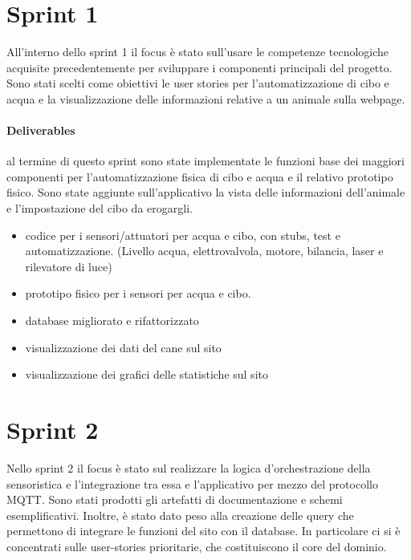 \section{Sprint 1}
All'interno dello sprint 1 il focus è stato sull'usare le competenze tecnologiche acquisite precedentemente per sviluppare i componenti principali del progetto. Sono stati scelti come obiettivi le user stories per l'automatizzazione di cibo e acqua e la visualizzazione delle informazioni relative a un animale sulla webpage.
\paragraph{Deliverables}
al termine di questo sprint sono state implementate le funzioni base dei maggiori componenti per l'automatizzazione fisica di cibo e acqua e il relativo prototipo fisico. Sono state aggiunte sull'applicativo la vista delle informazioni dell'animale e l'impostazione del cibo da erogargli. 
\begin{itemize}
    \item codice per i sensori/attuatori per acqua e cibo, con stubs, test e automatizzazione. (Livello acqua, elettrovalvola, motore, bilancia, laser e rilevatore di luce)
    \item prototipo fisico per i sensori per acqua e cibo. 
    \item database migliorato e rifattorizzato
    \item visualizzazione dei dati del cane sul sito 
    \item visualizzazione dei grafici delle statistiche sul sito 
\end{itemize}

\section{Sprint 2}
Nello sprint 2 il focus è stato sul realizzare la logica d'orchestrazione della sensoristica e l'integrazione tra essa e l'applicativo per mezzo del protocollo MQTT. Sono stati prodotti gli artefatti di documentazione e schemi esemplificativi. Inoltre, è stato dato peso alla creazione delle query che permettono di integrare le funzioni del sito con il database. In particolare ci si è concentrati sulle user-stories prioritarie, che costituiscono il core del dominio.
